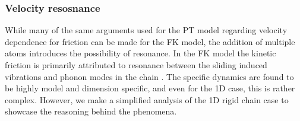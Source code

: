 





\subsubsection{Velocity resosnance} %
While many of the same arguments used for the \acrshort{PT} model regarding velocity dependence for friction can be made for the \acrshort{FK} model, the addition of multiple atoms introduces the possibility of resonance. In the \acrshort{FK} model the kinetic friction is primarily attributed to resonance between the sliding induced vibrations and phonon modes in the chain \cite{FK2D}. The specific dynamics are found to be highly model and dimension specific, and even for the 1D case, this is rather complex. However, we make a simplified analysis of the 1D rigid chain case to showcase the reasoning behind the phenomena.

